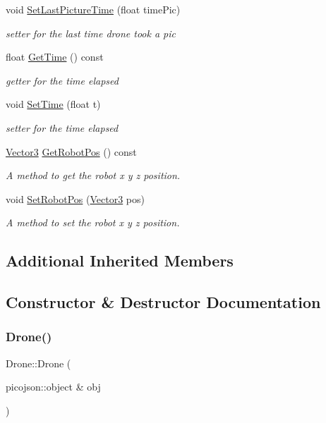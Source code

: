 \begin{DoxyCompactItemize}
void \hyperlink{classDrone_af639374e11eb02702665ba9f71697a01}{Set\+Last\+Picture\+Time} (float time\+Pic)
\begin{DoxyCompactList}\small\item\em setter for the last time drone took a pic \end{DoxyCompactList}\item 
float \hyperlink{classDrone_a0fde6a9a239da64ae102053c6404fe4d}{Get\+Time} () const
\begin{DoxyCompactList}\small\item\em getter for the time elapsed \end{DoxyCompactList}\item 
void \hyperlink{classDrone_a3c8e1ccbff90c7b5192679317f219061}{Set\+Time} (float t)
\begin{DoxyCompactList}\small\item\em setter for the time elapsed \end{DoxyCompactList}\item 
\hyperlink{classVector3}{Vector3} \hyperlink{classDrone_afdba5de8493255a433d62382991dfe8e}{Get\+Robot\+Pos} () const
\begin{DoxyCompactList}\small\item\em A method to get the robot x y z position. \end{DoxyCompactList}\item 
void \hyperlink{classDrone_a384abec1f84c15ec1c5533d9ccc8b865}{Set\+Robot\+Pos} (\hyperlink{classVector3}{Vector3} pos)
\begin{DoxyCompactList}\small\item\em A method to set the robot x y z position. \end{DoxyCompactList}\end{DoxyCompactItemize}
\subsection*{Additional Inherited Members}


\subsection{Constructor \& Destructor Documentation}
\mbox{\label{classDrone_a4f426cef8328894a819cc31ba4b2bcdb}} 
\subsubsection{\texorpdfstring{Drone()}{Drone()}}
{\footnotesize\ttfamily Drone\+::\+Drone (\begin{DoxyParamCaption}\item[{picojson\+::object \&}]{obj }\end{DoxyParamCaption})\hspace{0.3cm}{\ttfamily [inline]}}



